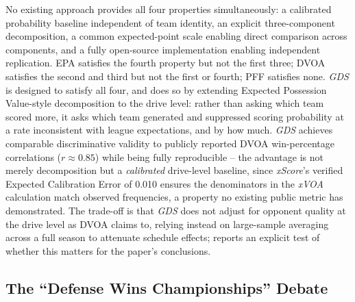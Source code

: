 \documentclass[12pt,a4paper]{article}
\newcommand{\xscore}{\textit{xScore}}
\newcommand{\xvoa}{\textit{xVOA}}
\newcommand{\gds}{\textit{GDS}}
\begin{document}
No existing approach provides all four properties simultaneously: a calibrated probability baseline independent of team identity, an explicit three-component decomposition, a common expected-point scale enabling direct comparison across components, and a fully open-source implementation enabling independent replication. EPA satisfies the fourth property but not the first three; DVOA satisfies the second and third but not the first or fourth; PFF satisfies none. \gds{} is designed to satisfy all four, and does so by extending Expected Possession Value-style decomposition \citep{cervone2016multiresolution} to the drive level: rather than asking which team scored more, it asks which team generated and suppressed scoring probability at a rate inconsistent with league expectations, and by how much. \gds{} achieves comparable discriminative validity to publicly reported DVOA win-percentage correlations ($r \approx 0.85$) while being fully reproducible -- the advantage is not merely decomposition but a \emph{calibrated} drive-level baseline, since \xscore{}'s verified Expected Calibration Error of 0.010 ensures the denominators in the \xvoa{} calculation match observed frequencies, a property no existing public metric has demonstrated. The trade-off is that \gds{} does not adjust for opponent quality at the drive level as DVOA claims to, relying instead on large-sample averaging across a full season to attenuate schedule effects;  reports an explicit test of whether this matters for the paper's conclusions.

\subsection{The ``Defense Wins Championships'' Debate}
\label{sec:dwc-debate}
\end{document}
